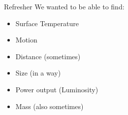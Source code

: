 \documentclass[pdf,aspectratio=169]{beamer}
\begin{document}

\begin{frame}{Refresher}
  We wanted to be able to find:
	\begin{itemize}
	  \item \alert<2->{Surface Temperature}
	  \item \alert<2->{Motion}
	  \item Distance (sometimes)
	  \item Size (in a way)
	  \item \alert<3->{Power output (Luminosity)}
	  \item Mass (also sometimes)
	\end{itemize}
\end{frame}
\end{document}
